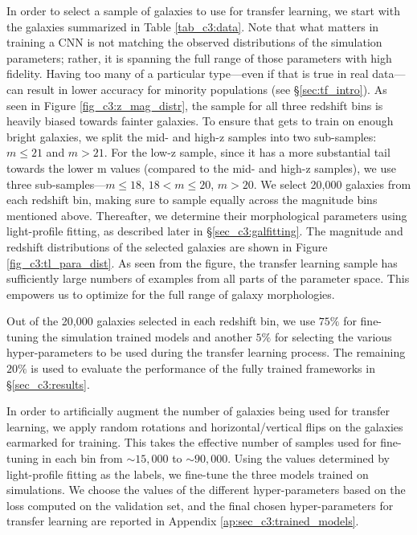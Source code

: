 In order to select a sample of galaxies to use for transfer learning, we start with the galaxies summarized in Table \ref{tab_c3:data}. Note that what matters in training a CNN is not matching the observed distributions of the simulation parameters; rather, it is spanning the full range of those parameters with high fidelity. Having too many of a particular type---even if that is true in real data---can result in lower accuracy for minority populations (see \S \ref{sec:tf_intro}). As seen in Figure \ref{fig_c3:z_mag_distr}, the sample for all three redshift bins is heavily biased towards fainter galaxies. To ensure that \gampen{} gets to train on enough bright galaxies, we split the mid- and high-z samples into two sub-samples: $m \leq 21$ and $m > 21$. For the low-z sample, since it has a more substantial tail towards the lower m values (compared to the mid- and high-z samples), we use  three sub-samples---$m \leq 18$, $18 < m \leq 20$, $m > 20$. We select 20,000 galaxies from each redshift bin, making sure to sample equally across the magnitude bins mentioned above. Thereafter, we determine their morphological parameters using light-profile fitting, as described later in \S \ref{sec_c3:galfitting}. The magnitude and redshift distributions of the selected galaxies are shown in Figure \ref{fig_c3:tl_para_dist}. As seen from the figure, the transfer learning sample has sufficiently large numbers of examples from all parts of the parameter space. This empowers us to optimize \gampen{} for the full range of galaxy morphologies.

Out of the 20,000 galaxies selected in each redshift bin, we use $75\%$ for fine-tuning the simulation trained \gampen{} models and another $5\%$ for selecting the various hyper-parameters to be used during the transfer learning process. The remaining $20\%$ is used to evaluate the performance of the fully trained \gampen{} frameworks in \S \ref{sec_c3:results}.

In order to artificially augment the number of galaxies being used for transfer learning, we apply random rotations and horizontal/vertical flips on the galaxies earmarked for training. This takes the effective number of samples used for fine-tuning in each bin from $\sim15,000$ to $\sim90,000$. Using the values determined by light-profile fitting as the labels, we fine-tune the three \gampen{} models trained on simulations. We choose the values of the different hyper-parameters based on the loss computed on the validation set, and the final chosen hyper-parameters for transfer learning are reported in Appendix \ref{ap:sec_c3:trained_models}. 
    
